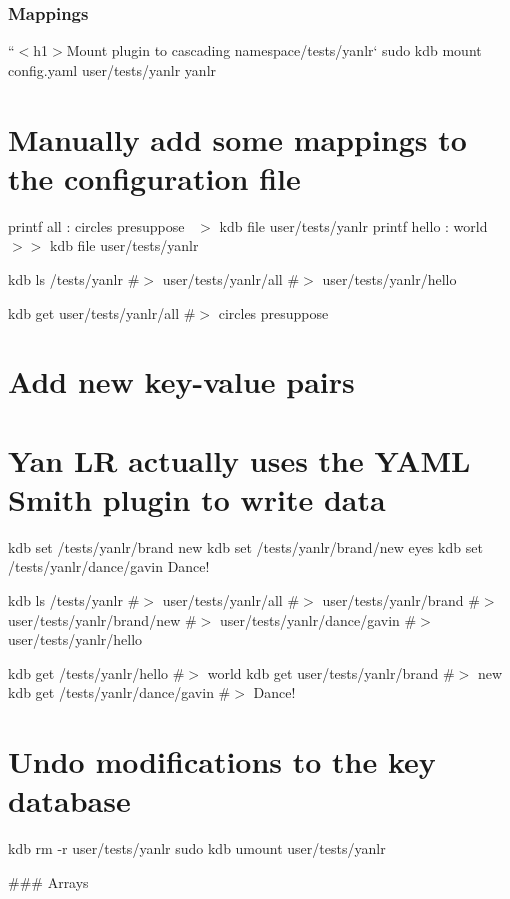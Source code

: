 \subsubsection*{Mappings}

``{\ttfamily  $<$h1$>$Mount plugin to cascading namespace}/tests/yanlr` sudo kdb mount config.\+yaml user/tests/yanlr yanlr

\section*{Manually add some mappings to the configuration file}

printf \textquotesingle{}all \+: circles presuppose~\newline
\textquotesingle{} $>$ {\ttfamily kdb file user/tests/yanlr} printf \textquotesingle{}hello \+: world~\newline
\textquotesingle{} $>$$>$ {\ttfamily kdb file user/tests/yanlr}

kdb ls /tests/yanlr \#$>$ user/tests/yanlr/all \#$>$ user/tests/yanlr/hello

kdb get user/tests/yanlr/all \#$>$ circles presuppose

\section*{Add new key-\/value pairs}

\section*{Yan LR actually uses the Y\+A\+ML Smith plugin to write data}

kdb set /tests/yanlr/brand new kdb set /tests/yanlr/brand/new eyes kdb set /tests/yanlr/dance/gavin \textquotesingle{}Dance!\textquotesingle{}

kdb ls /tests/yanlr \#$>$ user/tests/yanlr/all \#$>$ user/tests/yanlr/brand \#$>$ user/tests/yanlr/brand/new \#$>$ user/tests/yanlr/dance/gavin \#$>$ user/tests/yanlr/hello

kdb get /tests/yanlr/hello \#$>$ world kdb get user/tests/yanlr/brand \#$>$ new kdb get /tests/yanlr/dance/gavin \#$>$ Dance!

\section*{Undo modifications to the key database}

kdb rm -\/r user/tests/yanlr sudo kdb umount user/tests/yanlr 
\begin{DoxyCode}
### Arrays
\end{DoxyCode}
